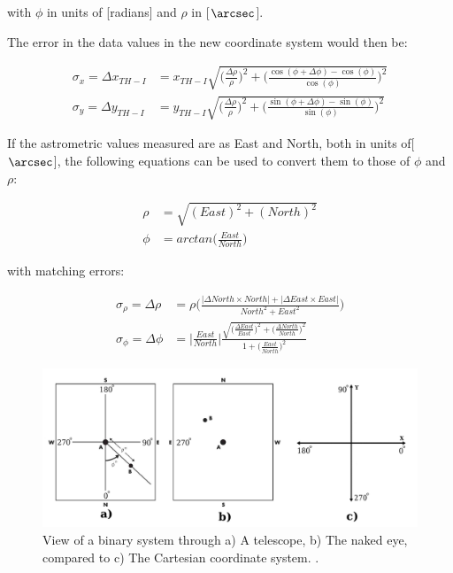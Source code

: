 \documentclass[12pt,preprint]{aastex}
\begin{document}
with $\phi$ in units of [radians] and $\rho$ in [$\arcsec$].

The error in the data values in the new coordinate system would then be:

\begin{subequations}
\begin{align}\label{eq:28-3a}
\sigma_{x}=\Delta x_{TH-I}& = x_{TH-I} \sqrt{\bigg(\frac{\Delta\rho}{\rho}\bigg)^2 +\bigg(\frac{\cos(\phi+\Delta\phi)-\cos(\phi)}{\cos(\phi)}\bigg)^2} \\
\label{eq:28-3b}
\sigma_{y}=\Delta y_{TH-I}& = y_{TH-I} \sqrt{\bigg(\frac{\Delta\rho}{\rho}\bigg)^2 +\bigg(\frac{\sin(\phi+\Delta\phi)-\sin(\phi)}{\sin(\phi)}\bigg)^2} 
\end{align}
\end{subequations}

If the astrometric values measured are as East and North, both in units of[$\arcsec$], the following equations can be used to convert them to those of $\phi$ and $\rho$: 

\begin{subequations}
\begin{align}\label{eq:22-a}
\rho& = \sqrt{(East)^2+(North)^2} \\
\label{eq:29-b}
\phi& = arctan\bigg(\frac{East}{North} \bigg) 
\end{align}
\end{subequations}

with matching errors:

\begin{subequations}
\begin{align}\label{eq:30-a}
\sigma_{\rho}=\Delta \rho& = \rho \bigg(\frac{|\Delta North \times North| + |\Delta East \times East|}{North^2 + East^2}\bigg)\\
\label{eq:30-b}
\sigma_{\phi}=\Delta \phi& = \Bigg|\frac{East}{North}\Bigg|\frac{\sqrt{\big( \frac{\Delta East}{East} \big)^2+\big(\frac{\Delta North}{North} \big)^2}}{1+\big(\frac{East}{North} \big)^2   } 
\end{align}
\end{subequations}

\begin{figure}[h]
\begin{center}
\includegraphics[scale=0.9]{Figures/Argyle-oribit-plots1-cropped-AND-cartesianCoordsPlot.jpg}
\caption[View of a Binary System]{ View of a binary system through a) A telescope, b) The naked eye, compared to c) The Cartesian coordinate system. \citet{Argyle}. }
\label{fig:4}
\end{center}
\end{figure}
\end{document}
